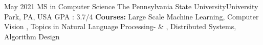 
  
%
%
%

\newcommand{\RomanNumeralCaps}[1]
    {\MakeUppercase{\romannumeral #1}}

\vspace{-2.5em}



\begin{education}
    \educat
		{May 2021}			{MS in Computer Science} {The Pennsylvania State University}{University Park, PA, USA \hfill GPA : 3.7/4} {}         { \textbf{Courses:} Large Scale Machine Learning, Computer Vision \RomanNumeralCaps 2, Topics in Natural Language Processing-  \& , Distributed Systems, Algorithm Design }
	\emptySeparator
	
	
\end{education}




